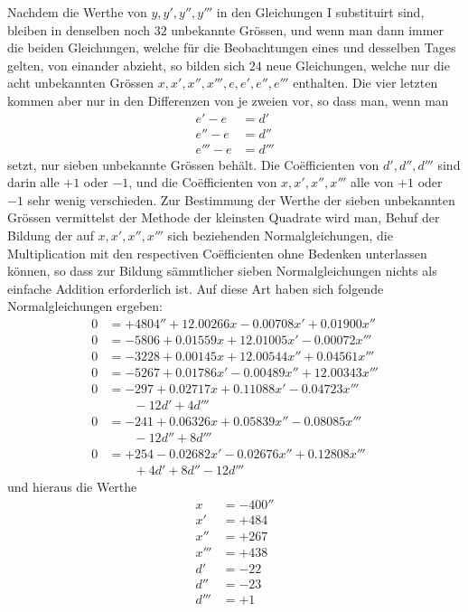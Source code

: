 Nachdem die Werthe von $y,y',y'',y'''$ in den Gleichungen I substituirt sind, bleiben in denselben noch $32$ unbekannte Grössen, und wenn man dann immer die beiden Gleichungen, welche für die Beobachtungen eines und desselben Tages gelten, von einander abzieht, so bilden sich $24$ neue Gleichungen, welche nur die acht unbekannten Grössen $x,x',x'',x''',e,e',e'',e'''$ enthalten. Die vier letzten kommen aber nur in den Differenzen von je zweien vor, so dass man, wenn man
\[
\begin{aligned}
e'-e&=d'\\
e''-e&=d''\\
e'''-e&=d'''
\end{aligned}
\]
setzt, nur sieben unbekannte Grössen behält. Die Coëfficienten von $d',d'',d'''$ sind darin alle $+1$ oder $-1$, und die Coëfficienten von $x,x',x'',x'''$ alle von $+1$ oder $-1$ sehr wenig verschieden. Zur Bestimmung der Werthe der sieben unbekannten Grössen vermittelst der Methode der kleinsten Quadrate wird man, Behuf der Bildung der auf $x,x',x'',x'''$ sich beziehenden Normalgleichungen, die Multiplication mit den respectiven Coëfficienten ohne Bedenken unterlassen können, so dass zur Bildung sämmtlicher sieben Normalgleichungen nichts als einfache Addition erforderlich ist. Auf diese Art haben sich folgende Normalgleichungen ergeben:
\[
\begin{aligned}
0&=+4804''+12.00266x-0.00708x'+0.01900x''\\
0&=-5806+0.01559x+12.01005x'-0.00072x'''\\
0&=-3228+0.00145x+12.00544x''+0.04561x'''\\
0&=-5267+0.01786x'-0.00489x''+12.00343x'''\\
0&=-297+0.02717x+0.11088x'-0.04723x'''\\
 &\qquad-12d'+4d'''\\
0&=-241+0.06326x+0.05839x''-0.08085x'''\\
 &\qquad-12d''+8d'''\\
0&=+254-0.02682x'-0.02676x''+0.12808x'''\\
 &\qquad+4d'+8d''-12d'''
\end{aligned}
\]
und hieraus die Werthe
\[
\begin{aligned}
x&=-400''\\
x'&=+484\\
x''&=+267\\
x'''&=+438\\
d'&=-22\\
d''&=-23\\
d'''&=+1
\end{aligned}
\]
